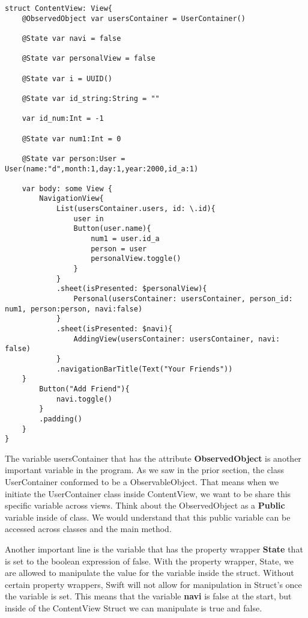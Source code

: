 \documentclass{article}
\theoremstyle{theorem}
\theoremstyle{definition}
\theoremstyle{remark}
\begin{document}
\begin{verbatim}
struct ContentView: View{
    @ObservedObject var usersContainer = UserContainer()
    
    @State var navi = false
    
    @State var personalView = false
    
    @State var i = UUID()
    
    @State var id_string:String = ""
    
    var id_num:Int = -1
    
    @State var num1:Int = 0
    
    @State var person:User = User(name:"d",month:1,day:1,year:2000,id_a:1) 
    
    var body: some View {
        NavigationView{
            List(usersContainer.users, id: \.id){
                user in
                Button(user.name){
                    num1 = user.id_a
                    person = user
                    personalView.toggle()
                }
            }
            .sheet(isPresented: $personalView){
                Personal(usersContainer: usersContainer, person_id: num1, person:person, navi:false)
            }
            .sheet(isPresented: $navi){
                AddingView(usersContainer: usersContainer, navi: false)
            }
            .navigationBarTitle(Text("Your Friends"))
    }
        Button("Add Friend"){
            navi.toggle()
        }
        .padding()
    }
}
\end{verbatim}

\noindent\newline The variable usersContainer that has the attribute \textbf{ObservedObject} is another important variable in the program. As we saw in the prior section, the class UserContainer conformed to be a ObservableObject. That means when we initiate the UserContainer class inside ContentView, we want to be share this specific variable across views. Think about the ObservedObject as a \textbf{Public} variable inside of class. We would understand that this public variable can be accessed across classes and the main method. 

\noindent\newline Another important line is the variable that has the property wrapper \textbf{State} that is set to the boolean expression of false. With the property wrapper, State, we are allowed to manipulate the value for the variable inside the struct. Without certain property wrappers, Swift will not allow for manipulation in Struct's once the variable is set. This means that the variable \textbf{navi} is false at the start, but inside of the ContentView Struct we can manipulate is true and false.
\end{document}

